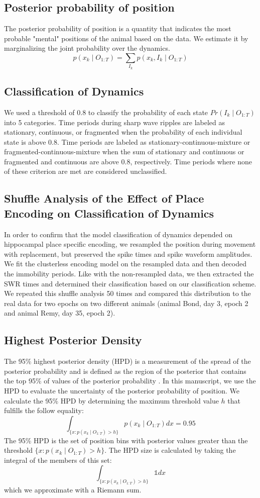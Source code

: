 \documentclass[times, twoside]{zHenriquesLab-StyleBioRxiv}
\begin{document}
\subsection*{Posterior probability of position}
The posterior probability of position is a quantity that indicates the most probable "mental" positions of the animal based on the data. We estimate it by marginalizing the joint probability over the dynamics.
$$p(x_{k} \mid O_{1:T}) = \sum_{I_{k}} p(x_{k}, I_{k} \mid O_{1:T})$$

\subsection*{Classification of Dynamics}
We used a threshold of 0.8 to classify the probability of each state $Pr(I_{k} \mid O_{1:T})$ into 5 categories. Time periods during sharp wave ripples are labeled as stationary, continuous, or fragmented when the probability of each individual state is above 0.8. Time periods are labeled as stationary-continuous-mixture or fragmented-continuous-mixture when the sum of stationary and continuous or fragmented and continuous are above 0.8, respectively. Time periods where none of these criterion are met are considered unclassified.


\subsection*{Shuffle Analysis of the Effect of Place Encoding on Classification of Dynamics}
In order to confirm that the model classification of dynamics depended on hippocampal place specific encoding, we resampled the position during movement with replacement, but preserved the spike times and spike waveform amplitudes. We fit the clusterless encoding model on the resampled data and then decoded the immobility periods. Like with the non-resampled data, we then extracted the SWR times and determined their classification based on our classification scheme. We repeated this shuffle analysis 50 times and compared this distribution to the real data for two epochs on two different animals (animal Bond, day 3, epoch 2 and animal Remy, day 35, epoch 2).

\subsection*{Highest Posterior Density}
The 95\% highest posterior density (HPD) is a measurement of the spread of the posterior probability and is defined as the region of the posterior that contains the top 95\% of values of the posterior probability \cite{CasellaStatisticalinference2001}. In this manuscript, we use the HPD to evaluate the uncertainty of the posterior probability of position. We calculate the 95\% HPD by determining the maximum threshold value $h$ that fulfills the follow equality:
$$
\int_{\{x: p(x_{k} \mid O_{1:T}) > h\}} p(x_{k} \mid O_{1:T})dx = 0.95
$$
The 95\% HPD is the set of position bins with posterior values greater than the threshold $\{x : p(x_{k} \mid O_{1:T}) > h\}$. The HPD size is calculated by taking the integral of the members of this set:
$$
\int_{\{x: p(x_{k} \mid O_{1:T}) > h\}} \mathbb{1}dx
$$
which we approximate with a Riemann sum.
\end{document}
